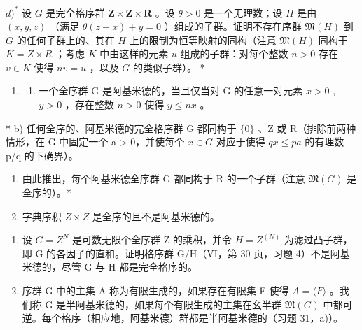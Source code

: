 \(d) ^{*}\) 设 \(G\) 是完全格序群 \(\mathbf{Z} \times \mathbf{Z} \times \mathbf{R}\) 。设 \(\theta > 0\) 是一个无理数；设 \(H\) 是由 \((x, y, z)\) （满足 \(\theta(z - x) + y = 0\) ）组成的子群。证明不存在序群 \(\mathfrak{M}(H)\) 到 \(G\) 的任何子群上的、其在 \(H\) 上的限制为恒等映射的同构（注意 \(\mathfrak{M}(H)\) 同构于 \(K = Z \times R\) ；考虑 \(K\) 中由这样的元素 \(u\) 组成的子群：对每个整数 \(n > 0\) 存在 \(v \in K\) 使得 \(nv = u\) ，以及 \(G\) 的类似子群）。 *

\begin{enumerate}
\def\labelenumi{\arabic{enumi})}
\setcounter{enumi}{32}
\tightlist
\item
  \begin{enumerate}
  \def\labelenumii{\alph{enumii})}
  \tightlist
  \item
    一个全序群 G 是阿基米德的，当且仅当对 G 的任意一对元素 \(x > 0\) , \(y > 0\) ，存在整数 \(n > 0\) 使得 \(y \leqslant nx\) 。
  \end{enumerate}
\end{enumerate}

* b) 任何全序的、阿基米德的完全格序群 G 都同构于 \(\{0\}\) 、Z 或 R（排除前两种情形，在 G 中固定一个 a \textgreater{} 0，并使每个 \(x \in G\) 对应于使得 \(qx \leq pa\) 的有理数 p/q 的下确界）。

\begin{enumerate}
\def\labelenumi{\alph{enumi})}
\setcounter{enumi}{2}
\item
  由此推出，每个阿基米德全序群 G 都同构于 R 的一个子群（注意 \(\mathfrak{M}(G)\) 是全序的）。*
\item
  字典序积 \(Z \times Z\) 是全序的且不是阿基米德的。
\end{enumerate}

\begin{enumerate}
\def\labelenumi{\arabic{enumi})}
\setcounter{enumi}{33}
\item
  设 \(G = Z^{N}\) 是可数无限个全序群 Z 的乘积，并令 \(H = Z^{(N)}\) 为滤过凸子群，即 G 的各因子的直和。证明格序群 G/H（VI，第 30 页，习题 4）不是阿基米德的，尽管 G 与 H 都是完全格序的。
\item
  序群 G 中的主集 A 称为有限生成的，如果存在有限集 F 使得 \(A = \langle F \rangle\) 。我们称 G 是半阿基米德的，如果每个有限生成的主集在幺半群 \(\mathfrak{M}(G)\) 中都可逆。每个格序（相应地，阿基米德）群都是半阿基米德的（习题 31，a)）。
\end{enumerate}

